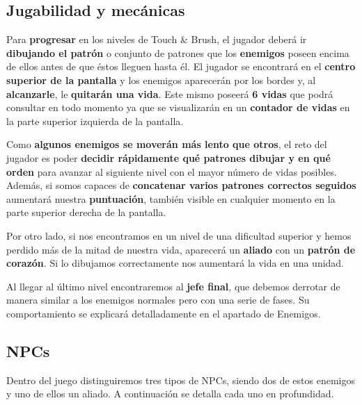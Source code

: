 \vspace{1cm}


\subsection{Jugabilidad y mecánicas}

Para \textbf{progresar} en los niveles de Touch \& Brush, el jugador deberá ir \textbf{dibujando el patrón} o conjunto de patrones que los \textbf{enemigos} poseen encima de ellos antes de que éstos lleguen hasta él. El jugador se encontrará en el \textbf{centro superior de la pantalla} y los enemigos aparecerán por los bordes y, al \textbf{alcanzarle}, le \textbf{quitarán una vida}. Este mismo poseerá \textbf{6 vidas} que podrá consultar en todo momento ya que se visualizarán en un \textbf{contador de vidas} en la parte superior izquierda de la pantalla.

\vspace{0.5cm}

Como \textbf{algunos enemigos se moverán más lento que otros}, el reto del jugador es poder \textbf{decidir rápidamente qué patrones dibujar y en qué orden} para avanzar al siguiente nivel con el mayor número de vidas posibles. Además, si somos capaces de \textbf{concatenar varios patrones correctos seguidos} aumentará nuestra \textbf{puntuación}, también visible en cualquier momento en la parte superior derecha de la pantalla.

\vspace{0.5cm}

Por otro lado, si nos encontramos en un nivel de una dificultad superior y hemos perdido más de la mitad de nuestra vida, aparecerá un \textbf{aliado} con un \textbf{patrón de corazón}. Si lo dibujamos correctamente nos aumentará la vida en una unidad.

\vspace{0.5cm}

Al llegar al último nivel encontraremos al \textbf{jefe final}, que debemos derrotar de manera similar a los enemigos normales pero con una serie de fases. Su comportamiento se explicará detalladamente en el apartado de Enemigos.

\vspace{1cm}

\subsection{NPCs}

Dentro del juego distinguiremos tres tipos de NPCs, siendo dos de estos enemigos y uno de ellos un aliado. A continuación se detalla cada uno en profundidad.

